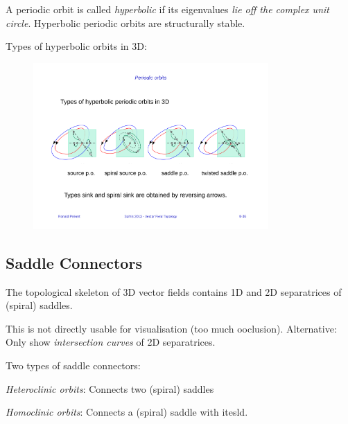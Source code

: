 A periodic orbit is called \emph{hyperbolic} if its eigenvalues \emph{lie off the complex unit circle}. Hyperbolic periodic orbits are structurally stable.

Types of hyperbolic orbits in 3D:
\begin{figure}[H]
    \centering
    \includegraphics[width=0.8\textwidth]{img/08_periodic_orbits}
\end{figure}

\subsection{Saddle Connectors}
The topological skeleton of 3D vector fields contains 1D and 2D separatrices of (spiral) saddles. 

This is not directly usable for visualisation (too much ooclusion). Alternative: Only show \emph{intersection curves} of 2D separatrices.

Two types of saddle connectors:
\begin{description}
    \item \emph{Heteroclinic orbits}: Connects two (spiral) saddles
    \item \emph{Homoclinic orbits}: Connects a (spiral) saddle with itesld.
\end{description}


